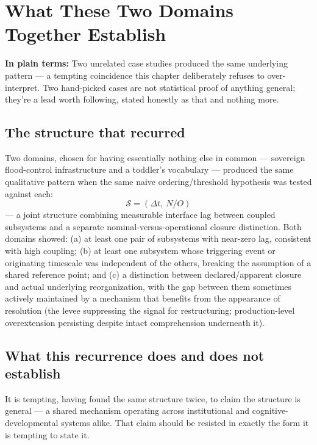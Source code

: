 \chapter{What These Two Domains Together Establish}
\label{ch:two-domains}

\begin{plainlanguage}
\textbf{In plain terms:} Two unrelated case studies produced the same underlying pattern — a tempting coincidence this chapter deliberately refuses to over-interpret. Two hand-picked cases are not statistical proof of anything general; they're a lead worth following, stated honestly as that and nothing more.
\end{plainlanguage}

\section{The structure that recurred}

Two domains, chosen for having essentially nothing else in common --- sovereign flood-control infrastructure and a toddler's vocabulary --- produced the same qualitative pattern when the same naive ordering/threshold hypothesis was tested against each:
\[
\mathcal{S} = (\Delta t,\ N/O)
\]
--- a joint structure combining measurable interface lag between coupled subsystems and a separate nominal-versus-operational closure distinction. Both domains showed: (a) at least one pair of subsystems with near-zero lag, consistent with high coupling; (b) at least one subsystem whose triggering event or originating timescale was independent of the others, breaking the assumption of a shared reference point; and (c) a distinction between declared/apparent closure and actual underlying reorganization, with the gap between them sometimes actively maintained by a mechanism that benefits from the appearance of resolution (the levee suppressing the signal for restructuring; production-level overextension persisting despite intact comprehension underneath it).

\section{What this recurrence does and does not establish}

It is tempting, having found the same structure twice, to claim the structure is general --- a shared mechanism operating across institutional and cognitive-developmental systems alike. That claim should be resisted in exactly the form it is tempting to state it.

